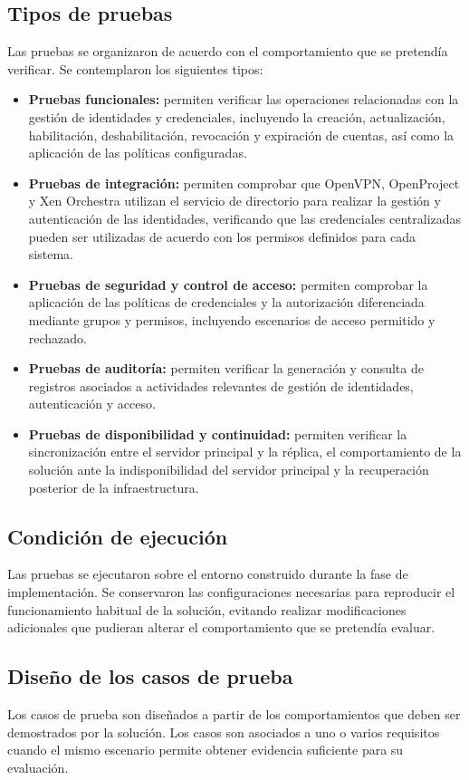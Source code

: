 \subsection{Tipos de pruebas}
Las pruebas se organizaron de acuerdo con el comportamiento que se pretendía verificar. Se contemplaron los siguientes tipos:
\begin{itemize}
	\item \textbf{Pruebas funcionales:} permiten verificar las operaciones relacionadas con la gestión de identidades y credenciales, incluyendo la creación, actualización, habilitación, deshabilitación, revocación y expiración de cuentas, así como la aplicación de las políticas configuradas.
	\item \textbf{Pruebas de integración:} permiten comprobar que OpenVPN, OpenProject y Xen Orchestra utilizan el servicio de directorio para realizar la gestión y autenticación de las identidades, verificando que las credenciales centralizadas pueden ser utilizadas de acuerdo con los permisos definidos para cada sistema.
	\item \textbf{Pruebas de seguridad y control de acceso:} permiten comprobar la aplicación de las políticas de credenciales y la autorización diferenciada mediante grupos y permisos, incluyendo escenarios de acceso permitido y rechazado.
	\item \textbf{Pruebas de auditoría:} permiten verificar la generación y consulta de registros asociados a actividades relevantes de gestión de identidades, autenticación y acceso.
	\item \textbf{Pruebas de disponibilidad y continuidad:} permiten verificar la sincronización entre el servidor principal y la réplica, el comportamiento de la solución ante la indisponibilidad del servidor principal y la recuperación posterior de la infraestructura.
\end{itemize}

\subsection{Condición de ejecución}
Las pruebas se ejecutaron sobre el entorno construido durante la fase de implementación. Se conservaron las configuraciones necesarias para reproducir el funcionamiento habitual de la solución, evitando realizar modificaciones adicionales que pudieran alterar el comportamiento que se pretendía evaluar.

\subsection{Diseño de los casos de prueba}
Los casos de prueba son diseñados a partir de los comportamientos que deben ser demostrados por la solución. Los casos son asociados a uno o varios requisitos cuando el mismo escenario permite obtener evidencia suficiente para su evaluación.

